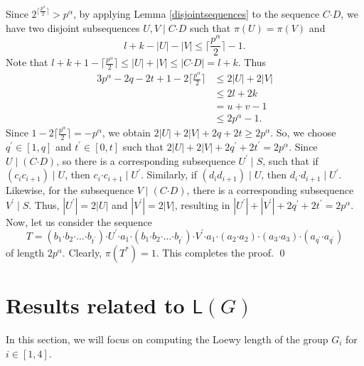 \documentclass[a4paper,11pt]{article}
\numberwithin{equation}{section}
\newcommand{\bdot}{\boldsymbol{\cdot}}
\newcommand{\no}{\noindent}
\begin{document}
\no Since $2^{\lceil \frac{p^{\alpha}}{2} \rceil} > p^{\alpha}$, by applying Lemma \ref{disjointsequences} to the sequence $C\bdot D$, we have two disjoint subsequences $U,V \mid C\bdot D$ such that $\pi(U)=\pi(V)$ and 
 $$l+k-|U|-|V| \le \bigg\lceil \frac{p^{\alpha}}{2} \bigg\rceil -1.$$
\no Note that $l+k+1-\bigg\lceil \frac{p^{\alpha}}{2} \bigg\rceil \le |U|+|V| \le |C \bdot D|=l+k.$ Thus
\begin{align*}
    3p^{\alpha}-2q-2t+1-2 \bigg\lceil \frac{p^{\alpha}}{2} \bigg\rceil 
    &\le 2|U|+ 2|V|\\
    &\le 2l+2k\\
    &= u+v-1\\
    &\le 2p^{\alpha}-1.
\end{align*}
Since $1-2\lceil \frac{p^{\alpha}}{2} \rceil=-p^{\alpha}$, we obtain
$2|U|+ 2|V|+2q+2t \ge 2p^{\alpha}.$ So, we choose $q^{\prime} \in [1, q]$ and $ t^{\prime} \in [0,t]$ such that $2|U|+ 2 |V|+2q^{\prime}+2t^{\prime}=2p^{\alpha}$. Since $U \mid (C\bdot D)$, so there is a corresponding subsequence $U^{\prime} \mid S$, such that if $(c_ic_{i+1}) \mid U$, then $ c_i \bdot c_{i+1} \mid U^{\prime}$. Similarly, if $(d_id_{i+1}) \mid U$, then $ d_i \bdot d_{i+1} \mid U^{\prime}$. Likewise, for the subsequence $V \mid (C\bdot D)$, there is a corresponding subsequence $V^{\prime} \mid S$. 
Thus, $|U^{\prime}|=2|U|$ and $|V^{\prime}|=2|V|$, resulting in $|U^{\prime}|+|V^{\prime}|+2q^{\prime}+2t^{\prime}=2p^{\alpha}$. Now, let us consider the sequence
$$T=(b_1 \bdot b_2 \bdot \dotsc \bdot b_{t^{\prime}}) \bdot U^{\prime } \bdot a_1 \bdot (b_1 \bdot b_2 \bdot \dotsc \bdot b_{t^{\prime}}) \bdot V^{\prime} \bdot a_1 \bdot (a_2\bdot a_2) \bdot (a_3\bdot a_3)\bdot (a_{q^{\prime}}\bdot a_{q^{\prime}})$$ of length $2p^{\alpha}$. Clearly, $\pi(T^{\ast})=1.$ This completes the proof.
 \qed


\section{Results related to $\mathsf{L}(G)$}\label{SectionL(G)}




\no In this section, we will focus on computing the Loewy length of the group $G_i$ for $i\in [1,4]$.
\end{document}
